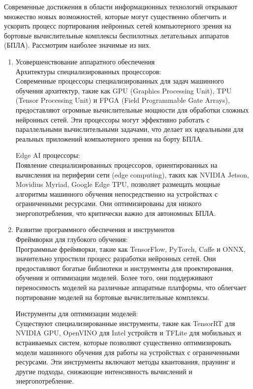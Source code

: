     Современные достижения в области информационных технологий открывают множество новых возможностей, которые могут существенно облегчить и ускорить процесс портирования нейронных сетей компьютерного зрения на бортовые вычислительные комплексы беспилотных летательных аппаратов (БПЛА). Рассмотрим наиболее значимые из них.

    \begin{enumerate}
        \item Усовершенствование аппаратного обеспечения \\
        Архитектуры специализированных процессоров: \\
        Современные процессоры специализированных для задач машинного обучения архитектур, такие как GPU (Graphics Processing Unit), TPU (Tensor Processing Unit) и FPGA (Field Programmable Gate Arrays), предоставляют огромные вычислительные мощности для обработки сложных нейронных сетей. Эти процессоры могут эффективно работать с параллельными вычислительными задачами, что делает их идеальными для реальных приложений компьютерного зрения на борту БПЛА.
        
        Edge AI процессоры: \\
        Появление специализированных процессоров, ориентированных на вычисления на периферии сети (edge computing), таких как NVIDIA Jetson, Movidius Myriad, Google Edge TPU, позволяет размещать мощные алгоритмы машинного обучения непосредственно на устройствах с ограниченными ресурсами. Они оптимизированы для низкого энергопотребления, что критически важно для автономных БПЛА.
        \item Развитие программного обеспечения и инструментов \\
        Фреймворки для глубокого обучения: \\
        Программные фреймворки, такие как TensorFlow, PyTorch, Caffe и ONNX, значительно упростили процесс разработки нейронных сетей. Они предоставляют богатые библиотеки и инструменты для проектирования, обучения и оптимизации моделей. Более того, они поддерживают переносимость моделей на различные аппаратные платформы, что облегчает портирование моделей на бортовые вычислительные комплексы.
        
        Инструменты для оптимизации моделей: \\
        Существуют специализированные инструменты, такие как TensorRT для NVIDIA GPU, OpenVINO для Intel устройств и TFLite для мобильных и встраиваемых систем, которые позволяют существенно оптимизировать модели машинного обучения для работы на устройствах с ограниченными ресурсами. Эти инструменты включают методы квантования, праунинг и другие подходы, снижающие интенсивность вычислений и энергопотребление.
        

\end{enumerate}
